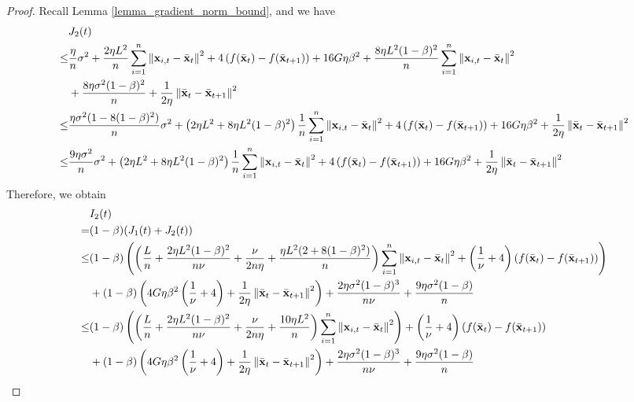 \documentclass{article}
\begin{document}
\begin{proof}
Recall Lemma \ref{lemma_gradient_norm_bound}, and we have
\begin{align}
\nonumber
& J_2(t) \\ \nonumber 
\le & \frac{\eta}{n} \sigma^2 + \frac{2\eta L^2}{n}\sum_{i=1}^n \left\lVert{\bf x}_{i,t} - \bar{{\bf x}}_t \right\rVert^2 + 4\left(  f(\bar{{\bf x}}_t) - f(\bar{{\bf x}}_{t+1})  \right) + 16 G\eta \beta^2 + \frac{8\eta L^2 (1-\beta)^2}{n}\sum_{i=1}^n \left\lVert{\bf x}_{i,t} - \bar{{\bf x}}_t\right\rVert^2  \\ \nonumber
& + \frac{8\eta \sigma^2 (1-\beta)^2}{n} + \frac{1}{2\eta} \left\lVert \bar{{\bf x}}_t - \bar{{\bf x}}_{t+1}\right\rVert^2 \\ \nonumber
\le & \frac{\eta \sigma^2 (1-8(1-\beta)^2)}{n} \sigma^2 + \left(  2\eta L^2 + 8\eta L^2(1-\beta)^2  \right)\frac{1}{n}\sum_{i=1}^n \left\lVert{\bf x}_{i,t} - \bar{{\bf x}}_t\right\rVert^2 + 4\left(  f(\bar{{\bf x}}_t) - f(\bar{{\bf x}}_{t+1})  \right) + 16G\eta \beta^2 + \frac{1}{2\eta} \left\lVert \bar{{\bf x}}_t - \bar{{\bf x}}_{t+1}\right\rVert^2 \\ \nonumber
\le & \frac{9\eta \sigma^2}{n} \sigma^2 + \left(  2\eta L^2 + 8\eta L^2(1-\beta)^2  \right)\frac{1}{n}\sum_{i=1}^n \left\lVert{\bf x}_{i,t} - \bar{{\bf x}}_t\right\rVert^2 + 4\left(  f(\bar{{\bf x}}_t) - f(\bar{{\bf x}}_{t+1})  \right) + 16G\eta \beta^2 + \frac{1}{2\eta} \left\lVert \bar{{\bf x}}_t - \bar{{\bf x}}_{t+1}\right\rVert^2
\end{align} Therefore, we obtain
\begin{align}
\nonumber
& I_2(t) \\ \nonumber 
= & (1-\beta)(J_1(t) + J_2(t)) \\ \nonumber
\le & (1-\beta) \left(  \left(  \frac{L}{n} + \frac{2\eta L^2(1-\beta)^2}{n\nu} + \frac{\nu}{2n\eta} + \frac{\eta L^2(2+8(1-\beta)^2)}{n}  \right)\sum_{i=1}^n\left\lVert{\bf x}_{i,t} - \bar{{\bf x}}_t \right\rVert^2 + \left( \frac{1}{\nu} + 4 \right)\left( f(\bar{{\bf x}}_t) - f(\bar{{\bf x}}_{t+1}) \right)  \right)\\ \nonumber 
&+ (1-\beta) \left(  4G\eta\beta^2\left( \frac{1}{\nu} + 4 \right) +  \frac{1}{2\eta} \left\lVert \bar{{\bf x}}_t - \bar{{\bf x}}_{t+1}\right\rVert^2  \right) + \frac{2\eta \sigma^2 (1-\beta)^3}{n\nu}+\frac{9\eta \sigma^2(1-\beta)}{n} \\ \nonumber
\le & (1-\beta) \left(  \left(  \frac{L}{n} + \frac{2\eta L^2(1-\beta)^2}{n\nu} + \frac{\nu}{2n\eta} + \frac{10\eta L^2}{n}  \right)\sum_{i=1}^n\left\lVert{\bf x}_{i,t} - \bar{{\bf x}}_t \right\rVert^2  \right) + \left( \frac{1}{\nu} + 4 \right)\left( f(\bar{{\bf x}}_t) - f(\bar{{\bf x}}_{t+1})  \right)\\ \nonumber 
&+ (1-\beta) \left(  4G\eta\beta^2\left( \frac{1}{\nu} + 4 \right) +  \frac{1}{2\eta} \left\lVert \bar{{\bf x}}_t - \bar{{\bf x}}_{t+1}\right\rVert^2  \right) + \frac{2\eta \sigma^2 (1-\beta)^3}{n\nu}+\frac{9\eta \sigma^2(1-\beta)}{n}
\end{align}






\end{proof}
\end{document}
